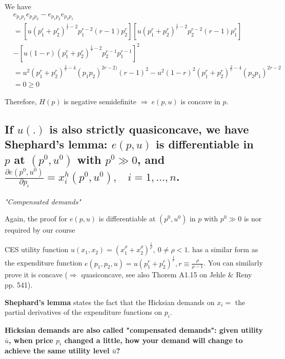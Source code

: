 \documentclass{article}
\begin{document}
\begin{mdframed}[backgroundcolor=blue!20,linecolor=white]
We have
\begin{align*}
&e_{p_1p_1}e_{p_2p_2} - e_{p_1p_2}e_{p_2p_1} \\
&=[u(p_1^{r} + p_2^{r})^{\frac{1}{r} - 2} p_1^{r-2} (r-1)p_2^r][u(p_1^{r} + p_2^{r})^{\frac{1}{r} - 2} p_2^{r-2} (r-1)p_1^r] \\
& - [u (1-r)(p_1^{r} + p_2^{r})^{\frac{1}{r} - 2} p_2^{r-1}p_1^{r-1}]^2 \\ &=u^2(p_1^{r} + p_2^{r})^{\frac{2}{r} - 4}(p_1p_2)^{2r-2)} (r-1)^2 -
u^2(1-r)^2(p_1^{r} + p_2^{r})^{\frac{2}{r} - 4} (p_2p_1)^{2r-2} \\
&= 0 \ge 0
\end{align*}

Therefore, $H(p)$ is negative semidefinite $\Rightarrow \ e(p,u)$ is concave in $p$.

\end{mdframed}

\subsection{If $u(.)$ is also strictly quasiconcave, we have Shephard’s lemma: $e(p, u)$ is differentiable in $p$ at $(p^0, u^0)$ with $p^0 \gg 0$, and $\frac{\partial e(p^0, u^0)}{\partial p_i} = x^h_i (p^0, u^0), \ \ \ \ i = 1, . . . , n$.}

\begin{mdframed}[backgroundcolor=blue!20,linecolor=white]
\textit{"Compensated demands"}

Again, the proof for $e(p,u)$ is differentiable at $(p^0,u^0)$ in $p$ with $p^0 \gg 0$ is nor required by our course

CES utility function $u(x_1, x_2) = (x_1^{\rho} + x_2^{\rho})^{\frac{1}{\rho}}, \ 0 \ne \rho<1.$ has a similar form as the expenditure function 
$e(p_1,p_2, u) = u(p_1^{r} + p_2^{r})^{\frac{1}{r}} , r \equiv \frac{\rho}{\rho - 1}$. You can similarly prove it is concave ($\Rightarrow$ quasiconcave, see also Thorem A1.15 on Jehle \& Reny pp. 541).

\vspace{3mm}

\textbf{Shephard’s lemma} states the fact that the Hicksian demands on $x_i=$ the partial derivatives of the expenditure functions on $p_i$.

\textbf{Hicksian demands are also called "compensated demands": given utility $\bar{u}$, when price $p_i$ changed a little, how your demand will change to achieve the same utility level $\bar{u}$?}

\end{mdframed}
\end{document}
